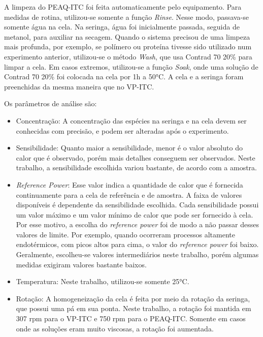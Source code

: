 		A limpeza do PEAQ-ITC foi feita automaticamente pelo equipamento. Para medidas de rotina, utilizou-se somente a função \emph{Rinse}. Nesse modo, passava-se somente água na cela. Na seringa, água foi inicialmente passada, seguida de metanol, para auxiliar na secagem. Quando o sistema precisou de uma limpeza mais profunda, por exemplo, se polímero ou proteína tivesse sido utilizado num experimento anterior, utilizou-se o método \emph{Wash}, que usa Contrad 70 20\% para limpar a cela. Em casos extremos, utilizou-se a função \emph{Soak}, onde uma solução de Contrad 70 20\% foi colocada na cela por 1h a 50°C. A cela e a seringa foram preenchidas da mesma maneira que no VP-ITC.
		
		Os parâmetros de análise são:
		
		\begin{itemize}[noitemsep]
			
			\item Concentração: A concentração das espécies na seringa e na cela devem ser conhecidas com precisão, e podem ser alteradas após o experimento.
			
			\item Sensibilidade: Quanto maior a sensibilidade, menor é o valor absoluto do calor que é observado, porém mais detalhes conseguem ser observados. Neste trabalho, a sensibilidade escolhida variou bastante, de acordo com a amostra.
			
			\item \emph{Reference Power}: Esse valor indica a quantidade de calor que é fornecida continuamente para a cela de referência e de amostra. A faixa de valores disponíveis é dependente da sensibilidade escolhida. Cada sensibilidade possui um valor máximo e um valor mínimo de calor que pode ser fornecido à cela. Por esse motivo, a escolha do \emph{reference power} foi de modo a não passar desses valores de limite. Por exemplo, quando ocorreram processos altamente endotérmicos, com picos altos para cima, o valor do \emph{reference power} foi baixo. Geralmente, escolheu-se valores intermediários neste trabalho, porém algumas medidas exigiram valores bastante baixos.
			
			\item Temperatura: Neste trabalho, utilizou-se somente 25°C.
				
			\item Rotação: A homogeneização da cela é feita por meio da rotação da seringa, que possui uma pá em sua ponta. Neste trabalho, a rotação foi mantida em 307 rpm para o VP-ITC e 750 rpm para o PEAQ-ITC. Somente em casos onde as soluções eram muito viscosas, a rotação foi aumentada.
			

\end{itemize}
